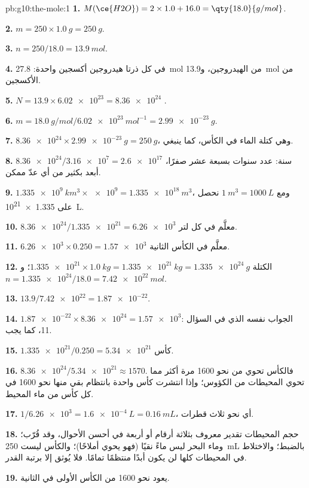 \begin{solution}{pb:g10:the-mole:1}
\textbf{1.} $M(\ce{H2O}) = 2 \times 1.0 + 16.0 = \qty{18.0}{g/mol}$.

\textbf{2.} $m = 250 \times \qty{1.0}{g} = \qty{250}{g}$.

\textbf{3.} $n = 250 / 18.0 = \qty{13.9}{mol}$.

\textbf{4.} في كل  ذرتا هيدروجين  أكسجين واحدة:
\qty{27.8}{mol} من  الهيدروجين، و\qty{13.9}{mol} من  الأكسجين.

\textbf{5.} $N = 13.9 \times \num{6.02e23} = \num{8.36e24}$ .

\textbf{6.} $m = \qty{18.0}{g/mol} / \qty{6.02e23}{mol^{-1}} =
\qty{2.99e-23}{g}$.

\textbf{7.} $\num{8.36e24} \times \qty{2.99e-23}{g} = \qty{250}{g}$، وهي
كتلة الماء في الكأس، كما ينبغي.

\textbf{8.} $\num{8.36e24} / \num{3.16e7} = \num{2.6e17}$ سنة: عدد سنوات
بسبعة عشر صفرًا، أبعد بكثير من أي عدّ ممكن.

\textbf{9.} $\qty{1.335e9}{km^3} \times \num{e9} = \qty{1.335e18}{m^3}$،
ومع $\qty{1}{m^3} = \qty{1000}{L}$ نحصل على \qty{1.335e21}{L}.

\textbf{10.} $\num{8.36e24} / \num{1.335e21} = \num{6.26e3}$  معلَّم
في كل لتر.

\textbf{11.} $\num{6.26e3} \times 0.250 = \num{1.57e3}$  معلَّم
في الكأس الثانية.

\textbf{12.} الكتلة $\num{1.335e21} \times \qty{1.0}{kg} =
\qty{1.335e21}{kg} = \qty{1.335e24}{g}$؛ و$n = \num{1.335e24} / 18.0 =
\qty{7.42e22}{mol}$.

\textbf{13.} $13.9 / \num{7.42e22} = \num{1.87e-22}$.

\textbf{14.} $\num{1.87e-22} \times \num{8.36e24} = \num{1.57e3}$: الجواب
نفسه الذي في السؤال 11، كما يجب.

\textbf{15.} $\num{1.335e21} / 0.250 = \num{5.34e21}$ كأس.

\textbf{16.} $\num{8.36e24} / \num{5.34e21} \approx 1570$. فالكأس تحوي من
 نحو 1600 مرة أكثر مما تحوي المحيطات من الكؤوس؛ وإذا انتشرت 
كأس واحدة بانتظام بقي منها نحو 1600 في كل كأس من ماء
المحيط.

\textbf{17.} $1 / \num{6.26e3} = \qty{1.6e-4}{L} = \qty{0.16}{mL}$، أي نحو
ثلاث قطرات.

\textbf{18.} حجم المحيطات تقدير معروف بثلاثة أرقام أو أربعة في أحسن الأحوال،
وقد قُرّب؛ وماء البحر ليس ماءً نقيًا (فهو يحوي أملاحًا)؛ والكأس ليست
\qty{250}{mL} بالضبط؛ والاختلاط في المحيطات كلها لن يكون أبدًا منتظمًا
تمامًا. فلا يُوثق إلا برتبة القدر.

\textbf{19.} يعود نحو 1600  من الكأس الأولى في
الثانية.
\end{solution}
